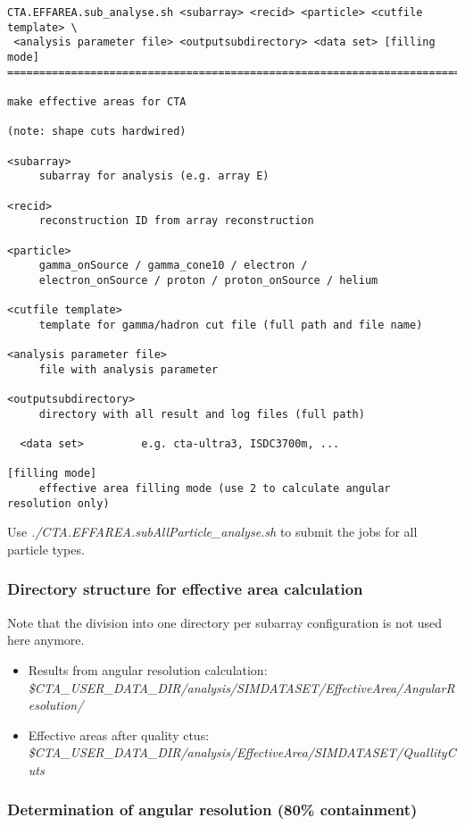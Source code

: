 \documentclass[titlepage,a4paper,twoside,11pt]{report}
\begin{document}
\begin{lstlisting}
CTA.EFFAREA.sub_analyse.sh <subarray> <recid> <particle> <cutfile template> \
 <analysis parameter file> <outputsubdirectory> <data set> [filling mode]
================================================================================

make effective areas for CTA

(note: shape cuts hardwired)

<subarray>
     subarray for analysis (e.g. array E)

<recid>
     reconstruction ID from array reconstruction

<particle>
     gamma_onSource / gamma_cone10 / electron / 
     electron_onSource / proton / proton_onSource / helium 

<cutfile template>
     template for gamma/hadron cut file (full path and file name)

<analysis parameter file>
     file with analysis parameter

<outputsubdirectory>
     directory with all result and log files (full path)

  <data set>         e.g. cta-ultra3, ISDC3700m, ...  

[filling mode]
     effective area filling mode (use 2 to calculate angular resolution only)
\end{lstlisting}

Use {\it  ./CTA.EFFAREA.subAllParticle\_analyse.sh} to submit the jobs for all particle types.

\subsubsection{Directory structure for effective area calculation}

Note that the division into one directory per subarray configuration is not used here anymore.

\begin{itemize}
\item Results from angular resolution calculation: \\
{\it \$CTA\_USER\_DATA\_DIR/analysis/SIMDATASET/EffectiveArea/AngularResolution/}
\item Effective areas after quality ctus:\\
{\it \$CTA\_USER\_DATA\_DIR/analysis/EffectiveArea/SIMDATASET/QuallityCuts}
\end{itemize}

\subsubsection{Determination of angular resolution (80\% containment)} 
\end{document}
